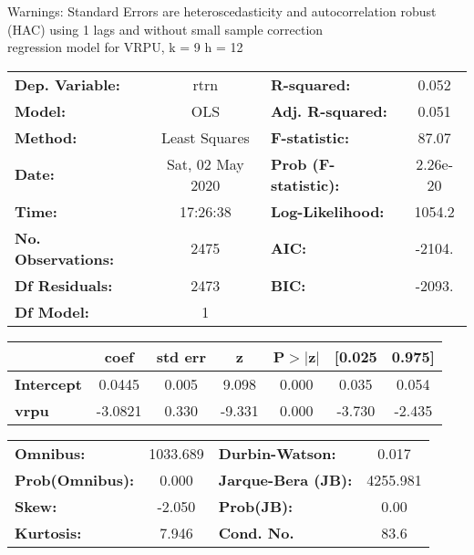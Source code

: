 Warnings: \newline
 [1] Standard Errors are heteroscedasticity and autocorrelation robust (HAC) using 1 lags and without small sample correction\\ 

regression model for VRPU, k = 9 h = 12\begin{center}
\begin{tabular}{lclc}
\toprule
\textbf{Dep. Variable:}    &       rtrn       & \textbf{  R-squared:         } &     0.052   \\
\textbf{Model:}            &       OLS        & \textbf{  Adj. R-squared:    } &     0.051   \\
\textbf{Method:}           &  Least Squares   & \textbf{  F-statistic:       } &     87.07   \\
\textbf{Date:}             & Sat, 02 May 2020 & \textbf{  Prob (F-statistic):} &  2.26e-20   \\
\textbf{Time:}             &     17:26:38     & \textbf{  Log-Likelihood:    } &    1054.2   \\
\textbf{No. Observations:} &        2475      & \textbf{  AIC:               } &    -2104.   \\
\textbf{Df Residuals:}     &        2473      & \textbf{  BIC:               } &    -2093.   \\
\textbf{Df Model:}         &           1      & \textbf{                     } &             \\
\bottomrule
\end{tabular}
\begin{tabular}{lcccccc}
                   & \textbf{coef} & \textbf{std err} & \textbf{z} & \textbf{P$> |$z$|$} & \textbf{[0.025} & \textbf{0.975]}  \\
\midrule
\textbf{Intercept} &       0.0445  &        0.005     &     9.098  &         0.000        &        0.035    &        0.054     \\
\textbf{vrpu}      &      -3.0821  &        0.330     &    -9.331  &         0.000        &       -3.730    &       -2.435     \\
\bottomrule
\end{tabular}
\begin{tabular}{lclc}
\textbf{Omnibus:}       & 1033.689 & \textbf{  Durbin-Watson:     } &    0.017  \\
\textbf{Prob(Omnibus):} &   0.000  & \textbf{  Jarque-Bera (JB):  } & 4255.981  \\
\textbf{Skew:}          &  -2.050  & \textbf{  Prob(JB):          } &     0.00  \\
\textbf{Kurtosis:}      &   7.946  & \textbf{  Cond. No.          } &     83.6  \\
\bottomrule
\end{tabular}
\end{center}

